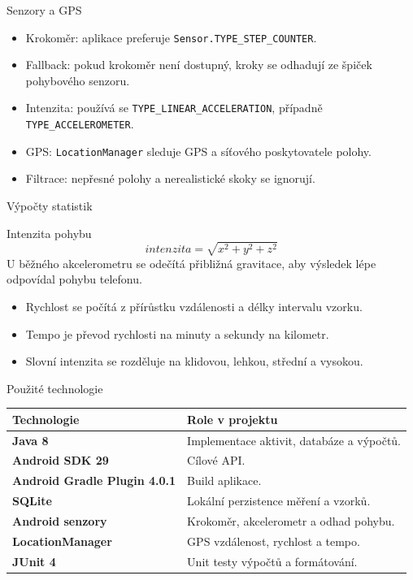 \documentclass[aspectratio=169]{beamer}
\begin{document}
\begin{frame}{Senzory a GPS}
  \begin{itemize}
    \item Krokoměr: aplikace preferuje \texttt{Sensor.TYPE\_STEP\_COUNTER}.
    \item Fallback: pokud krokoměr není dostupný, kroky se odhadují ze špiček pohybového senzoru.
    \item Intenzita: používá se \texttt{TYPE\_LINEAR\_ACCELERATION}, případně \texttt{TYPE\_ACCELEROMETER}.
    \item GPS: \texttt{LocationManager} sleduje GPS a síťového poskytovatele polohy.
    \item Filtrace: nepřesné polohy a nerealistické skoky se ignorují.
  \end{itemize}
\end{frame}

\begin{frame}{Výpočty statistik}
  \begin{block}{Intenzita pohybu}
    \[
      intenzita = \sqrt{x^2 + y^2 + z^2}
    \]
    U běžného akcelerometru se odečítá přibližná gravitace, aby výsledek lépe odpovídal pohybu telefonu.
  \end{block}
  \begin{itemize}
    \item Rychlost se počítá z přírůstku vzdálenosti a délky intervalu vzorku.
    \item Tempo je převod rychlosti na minuty a sekundy na kilometr.
    \item Slovní intenzita se rozděluje na klidovou, lehkou, střední a vysokou.
  \end{itemize}
\end{frame}

\begin{frame}{Použité technologie}
  \begin{table}
    \centering
    \begin{tabular}{>{\bfseries}p{}p{}}
      \toprule
      Technologie & Role v projektu \\
      \midrule
      Java 8 & Implementace aktivit, databáze a výpočtů. \\
      Android SDK 29 & Cílové API. \\
      Android Gradle Plugin 4.0.1 & Build aplikace. \\
      SQLite & Lokální perzistence měření a vzorků. \\
      Android senzory & Krokoměr, akcelerometr a odhad pohybu. \\
      LocationManager & GPS vzdálenost, rychlost a tempo. \\
      JUnit 4 & Unit testy výpočtů a formátování. \\
      \bottomrule
    \end{tabular}
  \end{table}
\end{frame}
\end{document}
